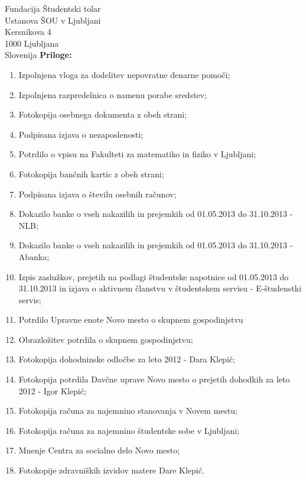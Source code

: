 \documentclass[a4paper]{scrlttr2}
\begin{document}
\begin{letter}{Fundacija Študentski tolar \\ Ustanova ŠOU v Ljubljani \\ Kersnikova 4 \\ 1000 Ljubljana \\ Slovenija}
\newpage
\textbf{Priloge:} \\
\begin{enumerate}
	\item Izpolnjena vloga za dodelitev nepovratne denarne pomoči;
	\item Izpolnjena razpredelnica o namenu porabe sredstev;
	\item Fotokopija osebnega dokumenta z obeh strani;
	\item Podpisana izjava o nezaposlenosti;
	\item Potrdilo o vpisu na Fakulteti za matematiko in fiziko v Ljubljani;
	\item Fotokopija bančnih kartic z obeh strani;
	\item Podpisana izjava o številu osebnih računov;
	\item Dokazilo banke o vseh nakazilih in prejemkih od 01.05.2013 do 31.10.2013 - NLB;
	\item Dokazilo banke o vseh nakazilih in prejemkih od 01.05.2013 do 31.10.2013 - Abanka;
	\item Izpis zaslužkov, prejetih na podlagi študentske napotnice od 01.05.2013 do 31.10.2013 in izjava o aktivnem članstvu v študentskem servisu - E-študenstki servis;
	\item Potrdilo Upravne enote Novo mesto o skupnem gospodinjstvu
	\item Obrazložitev potrdila o skupnem gospodinjstvu;
	\item Fotokopija dohodninske odločbe za leto 2012 - Dara Klepić;
	\item Fotokopija potrdila Davčne uprave Novo mesto o prejetih dohodkih za leto 2012 - Igor Klepić;
	\item Fotokopija računa za najemnino stanovanja v Novem mestu;
	\item Fotokopija računa za najemnino študentske sobe v Ljubljani;
	\item Mnenje Centra za socialno delo Novo mesto;
	\item Fotokopije zdravniških izvidov matere Dare Klepić.
	
	
\end{enumerate}

\vspace{5mm}





 
\end{letter}
 
\end{document}
